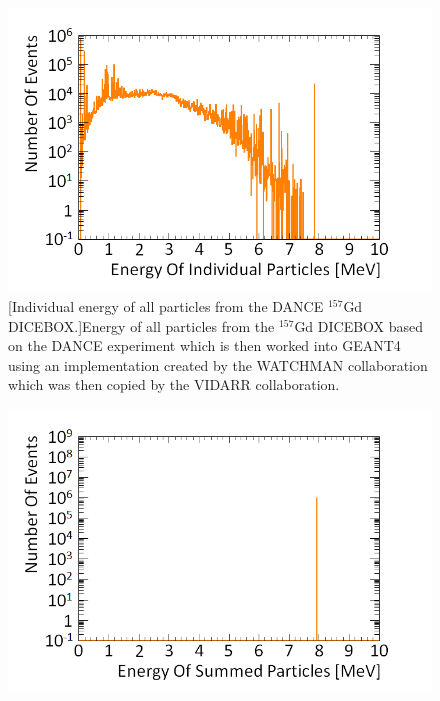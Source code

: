 
\begin{figure}[!h]
\centering
\begin{minipage}{.45\textwidth}
  \centering
  \includegraphics[width=\linewidth]{Chapter4/Figs/Raster/gadolinium/energyOfCascadeOfCascadeGdMedText.png}
  [Individual energy of all particles from the DANCE $^{157}$Gd DICEBOX.]{Energy of all particles from the $^{157}$Gd DICEBOX based on the DANCE experiment \cite{Chyzh_2011} which is then worked into GEANT4 using an implementation created by the WATCHMAN collaboration which was then copied by the VIDARR collaboration.} 
  \label{fig:energyOfCascadeOfCascadeGd}
\end{minipage}%
\qquad
\begin{minipage}{.45\textwidth}
  \centering
  \includegraphics[width=\linewidth]{Chapter4/Figs/Raster/gadolinium/conservationOfCascadeGd.png} 

\end{minipage}
\end{figure}
